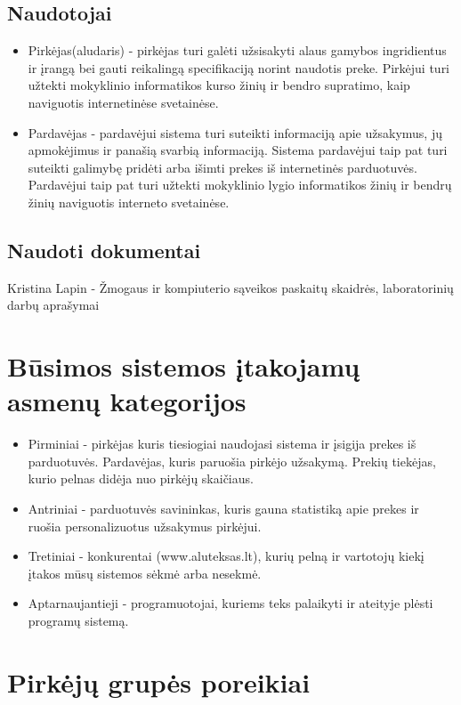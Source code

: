 \documentclass[oneside]{VUMIFPSkursinis}
\begin{document}
	\subsection{Naudotojai}
		\begin{itemize}
			\item{Pirkėjas(aludaris) - pirkėjas turi galėti užsisakyti alaus gamybos ingridientus ir įrangą bei gauti reikalingą specifikaciją norint naudotis preke.
				Pirkėjui turi užtekti mokyklinio informatikos kurso žinių ir bendro supratimo, kaip naviguotis internetinėse svetainėse.}
			\item{Pardavėjas - pardavėjui sistema turi suteikti informaciją apie užsakymus, jų apmokėjimus ir panašią svarbią informaciją.
				Sistema pardavėjui taip pat turi suteikti galimybę pridėti arba išimti prekes iš internetinės parduotuvės.
				Pardavėjui taip pat turi užtekti mokyklinio lygio informatikos žinių ir bendrų žinių naviguotis interneto svetainėse.}
		\end{itemize}
	\subsection{Naudoti dokumentai}
		Kristina Lapin - Žmogaus ir kompiuterio sąveikos paskaitų skaidrės, laboratorinių darbų aprašymai

\section{Būsimos sistemos įtakojamų asmenų kategorijos}
\begin{itemize}
			\item{Pirminiai - pirkėjas kuris tiesiogiai naudojasi sistema ir įsigija prekes iš parduotuvės. 
				Pardavėjas, kuris paruošia pirkėjo užsakymą. 
				Prekių tiekėjas, kurio pelnas didėja nuo pirkėjų skaičiaus.}
			\item{Antriniai - parduotuvės savininkas, kuris gauna statistiką apie prekes ir ruošia personalizuotus užsakymus pirkėjui.}
			\item{Tretiniai - konkurentai (www.aluteksas.lt), kurių pelną ir vartotojų kiekį įtakos mūsų sistemos sėkmė arba nesekmė. }
			\item{Aptarnaujantieji - programuotojai, kuriems teks palaikyti ir ateityje plėsti programų sistemą.}
		\end{itemize}

\section{Pirkėjų grupės poreikiai}
\end{document}
